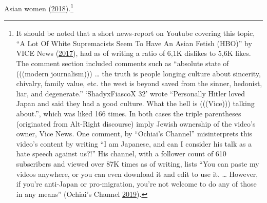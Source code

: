 \documentclass[10pt,british,A4paper,,openany]{memoir}
\begin{document}
Asian women (\protect\hyperlink{ref-lim_opinion_2018}{2018}).\footnote{It
  should be noted that a short news-report on Youtube covering this
  topic, ``A Lot Of White Supremacists Seem To Have An Asian Fetish
  (HBO)'' by VICE News
  (\protect\hyperlink{ref-vice_news_lot_2017}{2017}), had as of writing
  a ratio of 6,1K dislikes to 5,6K likes. The comment section included
  comments such as ``absolute state of (((modern journalism))) \ldots{}
  the truth is people longing culture about sincerity, chivalry, family
  value, etc. the west is beyond saved from the sinner, hedonist, liar,
  and degenerate.'' `ShadyxFiascoX 32' wrote ``Personally Hitler loved
  Japan and said they had a good culture. What the hell is (((Vice)))
  talking about.'', which was liked 166 times. In both cases the triple
  parentheses (originated from Alt-Right discourse) imply Jewish
  ownership of the video's owner, Vice News. One comment, by ``Ochiai's
  Channel'' misinterprets this video's content by writing ``I am
  Japanese, and can I consider his talk as a hate speech against us?!''
  His channel, with a follower count of 610 subscribers and viewed over
  87K times as of writing, lists ``You can paste my videos anywhere, or
  you can even download it and edit to use it. \ldots{} However, if
  you're anti-Japan or pro-migration, you're not welcome to do any of
  those in any means'' (Ochiai's Channel
  \protect\hyperlink{ref-noauthor_ochiais_nodate}{2019}).}
\end{document}
